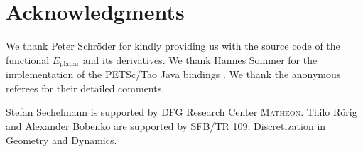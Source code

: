 \documentclass[twoside]{article}
\begin{document}
\section*{Acknowledgments}
We thank Peter Schr\"oder for kindly providing us with the source 
code of the functional $E_{\mathrm{planar}}$ and its derivatives.
We thank Hannes Sommer for the implementation of the PETSc/Tao Java 
bindings \cite{jpetsctao-web-page}. We thank the anonymous referees
for their detailed comments.

Stefan Sechelmann is supported by DFG Research Center \textsc{Matheon}. Thilo
R\"orig and Alexander Bobenko are supported by SFB/TR 109: Discretization in Geometry and Dynamics.
\newpage

\let\otb=\thebibliography\def\thebibliography#1{\otb{#1}\itemsep-3.5pt\small}


\end{document}
